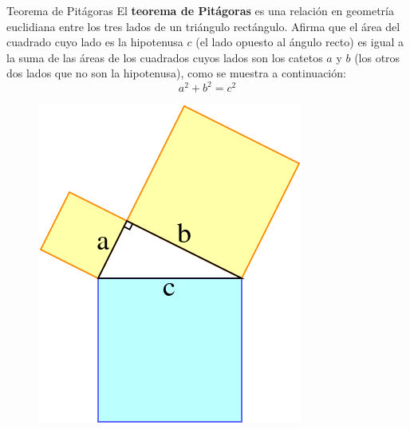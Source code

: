 \begin{infocard}{Teorema de Pitágoras}
    El \textbf{teorema de Pitágoras} es una relación en geometría euclidiana entre los tres lados de un triángulo rectángulo.
    Afirma que el área del cuadrado cuyo lado es la hipotenusa $c$ (el lado opuesto al ángulo recto) es igual a la suma de las áreas de los cuadrados cuyos lados son los catetos $a$ y $b$ (los otros dos lados que no son la hipotenusa), como se muestra a continuación:
    \[a^2+b^2=c^2\]
    \begin{figure}[H]
        \centering
        \includegraphics[width=0.55\linewidth]{../images/pythagorean_right_angle}
        \caption{}
        \label{fig:pythagorean_right_angle}
    \end{figure}






\end{infocard}
